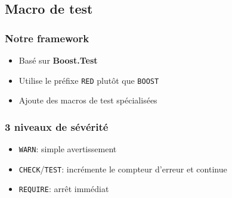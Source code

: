 \documentclass{beamer}
\newcommand{\code}[1]{\texttt{#1}}
\begin{document}
\subsection{Macro de test}


\begin{frame}[fragile]
\frametitle{Notre framework}
\begin{itemize}[<+->]
 \item Basé sur \textbf{Boost.Test}
 \item Utilise le préfixe \code{RED} plutôt que \code{BOOST}
 \item Ajoute des macros de test spécialisées
\end{itemize}
\end{frame}


\begin{frame}[fragile]
\frametitle{3 niveaux de sévérité}
\begin{itemize}[<+->]
 \item \code{WARN}: simple avertissement
 \item \code{CHECK}/\code{TEST}: incrémente le compteur d'erreur et continue
 \item \code{REQUIRE}: arrêt immédiat
\end{itemize}
\end{frame}
\end{document}
